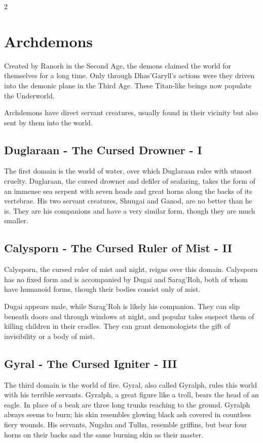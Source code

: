 \begin{multicols}{2}
{\section{Archdemons}\label{sec:erzdamonen2}

Created by Ranorh in the Second Age, the demons claimed the world for themselves for a long time. Only through Dhas'Garyll's actions were they driven into the demonic plane in the Third Age. These Titan-like beings now populate the Underworld.

Archdemons have direct servant creatures, usually found in their vicinity but also sent by them into the world.

\subsection{Duglaraan - The Cursed Drowner - I}\label{subsec:duglaraan-der-verfluchte-ersaufer}

The first domain is the world of water, over which Duglaraan rules with utmost cruelty. Duglaraan, the cursed drowner and defiler of seafaring, takes the form of an immense sea serpent with seven heads and great horns along the backs of its vertebrae. His two servant creatures, Shuugai and Ganod, are no better than he is. They are his companions and have a very similar form, though they are much smaller.

\subsection{Calysporn - The Cursed Ruler of Mist - II}\label{subsec:calysporn-der-verfluchte-herrscher-des-nebels}

Calysporn, the cursed ruler of mist and night, reigns over this domain. Calysporn has no fixed form and is accompanied by Dugai and Sarag'Roh, both of whom have humanoid forms, though their bodies consist only of mist.

Dugai appears male, while Sarag'Roh is likely his companion. They can slip beneath doors and through windows at night, and popular tales suspect them of killing children in their cradles. They can grant demonologists the gift of invisibility or a body of mist.

\subsection{Gyral - The Cursed Igniter - III}\label{subsec:gyral-der-verfluchte-entzunder}

The third domain is the world of fire. Gyral, also called Gyralph, rules this world with his terrible servants. Gyralph, a great figure like a troll, bears the head of an eagle. In place of a beak are three long trunks reaching to the ground. Gyralph always seems to burn; his skin resembles glowing black ash covered in countless fiery wounds. His servants, Nugshu and Tulhu, resemble griffins, but bear four horns on their backs and the same burning skin as their master.

}
\end{multicols}
